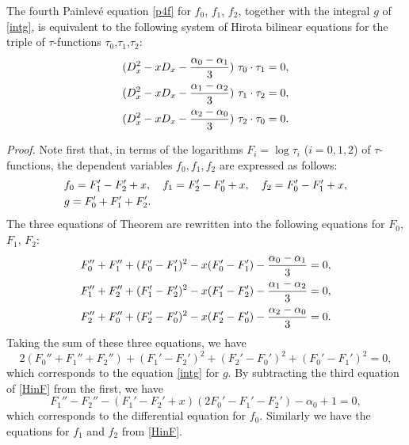 \begin{thm}\label{Hiro}
The fourth Painlev\'e equation \eqref{p4f} for $f_0$, $f_1$, $f_2$,
together with the integral $g$ of \eqref{intg}, is equivalent to the following 
system of Hirota bilinear equations for the triple of $\tau$-functions 
$\tau_0$,$\tau_1$,$\tau_2$:
\begin{align}\label{p4tau}
&(D_x^2-x D_x-\frac{\alpha_0-\alpha_1}{3} ) \ \tau_0 \cdot\tau_1=0, \notag\\ 
&(D_x^2-x D_x-\frac{\alpha_1-\alpha_2}{3} ) \ \tau_1 \cdot\tau_2=0, \\ 
&(D_x^2-x D_x-\frac{\alpha_2-\alpha_0}{3} ) \ \tau_2 \cdot\tau_0=0. \notag
\end{align}
\end{thm}
\medskip\noindent
{\em Proof.} \quad
Note first that, in terms of the logarithms $F_i=\log\tau_i$ ($i=0,1,2$) 
of $\tau$-functions, the dependent variables $f_0,f_1,f_2$ are expressed as follows: 
\begin{equation}
\label{fbyF}
\begin{align}
&f_0=F_1'-F_2'+x, \quad f_1=F_2'-F_0'+x, 
\quad f_2=F_0'-F_1'+x, \\
&g=F_0'+F_1'+F_2'.\notag
\end{align}
\end{equation}
The three equations of Theorem are rewritten into the following equations for $F_0$,
$F_1$, $F_2$:  
\begin{equation}
\label{HinF}
\begin{align}
F_0''+F_1''+(F_0'-F_1')^2-x(F_0'-F_1')-\frac{\alpha_0-\alpha_1}{3}=0,\notag\\
F_1''+F_2''+(F_1'-F_2')^2-x(F_1'-F_2')-\frac{\alpha_1-\alpha_2}{3}=0,\\
F_2''+F_0''+(F_2'-F_0')^2-x(F_2'-F_0')-\frac{\alpha_2-\alpha_0}{3}=0.\notag
\end{align}
\end{equation}
Taking the sum of these three equations, we have 
\begin{equation}
\label{Fsum}
2(F_0''+F_1''+F_2'')+(F_1'-F_2')^2+(F_2'-F_0')^2+(F_0'-F_1')^2=0,
\end{equation}
which corresponds to the equation \eqref{intg} for $g$. 
By subtracting the third equation of \eqref{HinF} from the first, we have
\begin{equation}
F_1''-F_2''-(F_1'-F_2'+x)(2F_0'-F_1'-F_2')-\alpha_0+1=0,
\end{equation}
which corresponds to the differential equation for $f_0$. 
Similarly we have the equations for $f_1$ and $f_2$ from \eqref{HinF}. 
